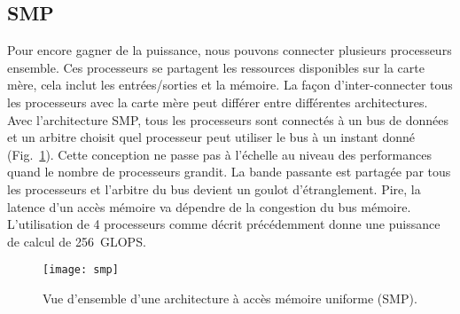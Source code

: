 \subsection{SMP}
Pour encore gagner de la puissance, nous pouvons connecter plusieurs processeurs ensemble.
%
Ces processeurs se partagent les ressources disponibles sur la carte mère, cela inclut les entrées/sorties et la mémoire.
%
La façon d'inter-connecter tous les processeurs avec la carte mère peut différer entre différentes architectures.
%
Avec l'architecture SMP, tous les processeurs sont connectés à un bus de données et un arbitre choisit quel processeur peut utiliser le bus à un instant donné (Fig.~\ref{fig:smp}).
%
Cette conception ne passe pas à l'échelle au niveau des performances quand le nombre de processeurs grandit.
%
La bande passante est partagée par tous les processeurs et l'arbitre du bus devient un goulot d'étranglement.
%
Pire, la latence d'un accès mémoire va dépendre de la congestion du bus mémoire.
%
L'utilisation de 4 processeurs comme décrit précédemment donne une puissance de calcul de 256~GLOPS.

\begin{figure}[!ht]
        \centering
        \texttt{[image: smp]}
        \caption{Vue d'ensemble d'une architecture à accès mémoire uniforme (SMP).}
        \label{fig:smp}
\end{figure}
